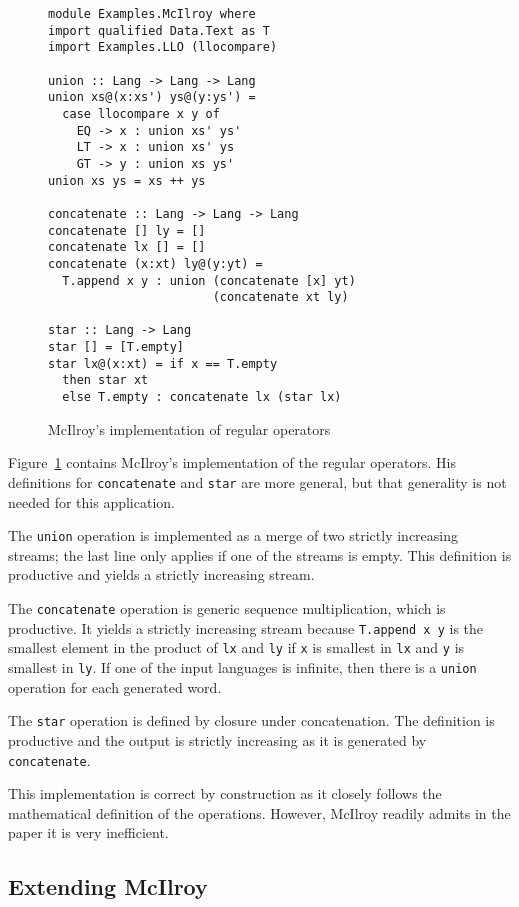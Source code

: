 \begin{figure}[btp]
\begin{lstlisting}
module Examples.McIlroy where
import qualified Data.Text as T
import Examples.LLO (llocompare)

union :: Lang -> Lang -> Lang
union xs@(x:xs') ys@(y:ys') =
  case llocompare x y of
    EQ -> x : union xs' ys'
    LT -> x : union xs' ys
    GT -> y : union xs ys'
union xs ys = xs ++ ys

concatenate :: Lang -> Lang -> Lang
concatenate [] ly = []
concatenate lx [] = []
concatenate (x:xt) ly@(y:yt) =
  T.append x y : union (concatenate [x] yt) 
                       (concatenate xt ly)

star :: Lang -> Lang
star [] = [T.empty]
star lx@(x:xt) = if x == T.empty
  then star xt
  else T.empty : concatenate lx (star lx)
\end{lstlisting}
  \caption{McIlroy's implementation of regular operators}
  \label{fig:regular-operators-0}
\end{figure}
Figure~\ref{fig:regular-operators-0} contains McIlroy's implementation
of the regular operators. His definitions for \lstinline{concatenate}
and \lstinline{star} are more general, but that generality is not
needed for this application.

The \lstinline{union} operation is
implemented as a merge of two strictly increasing streams; the last
line only applies if one of the streams is empty. This definition is
productive and yields a strictly increasing stream.

The \lstinline{concatenate} operation is generic
sequence multiplication, which is productive. It yields a strictly
increasing stream because \lstinline{T.append x y} is the smallest
element in the product of \lstinline{lx} and \lstinline{ly} if
\lstinline{x} is smallest in \lstinline{lx} and \lstinline{y} is
smallest in \lstinline{ly}. If one of the input languages is infinite, then there is
a \lstinline{union} operation for each generated word.

The \lstinline{star} operation is defined by closure under concatenation. The definition
is productive and the output is strictly increasing as it is generated by
\lstinline{concatenate}.

This implementation is correct by construction as it closely follows the mathematical
definition of the operations. However, McIlroy readily admits in the paper it is very
inefficient.

\subsection{Extending McIlroy}
\label{sec:extending-mcilroy}

